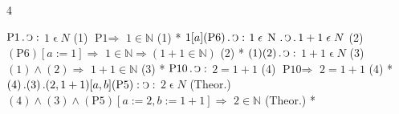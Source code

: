 \documentclass{book}
\newcommand{\s}{\switchcolumn} %
\newcommand{\C}{\mathop{\sbox0{$\displaystyle$$\reflectbox{C}$} %
\raisebox{-\height+\ht0-0.05cm}[\ht0][\dp0]{\scalebox{0.8}[0.8]{\copy0}}}\displaylimits} %
\newcommand{\p}{\mathop{\sbox0{$\displaystyle$$.$}
\raisebox{-\height+\ht0}[\ht0][\dp0]{\scalebox{1}[1]{\copy0}}}\displaylimits} %
\newcommand{\smallIn}{\ensuremath{\mathrel{\epsilon}}}
\newcommand{\N}{\mathop{\thinspace \text{N} \thinspace}}
\renewcommand{\rightarrow}{\Rightarrow}
\newenvironment{translateFourCol}[4]
               { %
                 \setcolumnwidth{#1\fill/1em, #2\fill/\columnsep, #3\fill/1em, #4\fill}
                 \begin{paracol}{4}
                 \newcommand{\LAT}{\switchcolumn[0]*}
                 \newcommand{\ENG}{\switchcolumn[2]}
               }
               { %
                 \let\ENG\undefined
                 \let\LAT\undefined
                 \end{paracol}
               }
\begin{document}
\begin{translateFourCol}{0.25}{0.25}{0.25}{0.25}
\raggedright
$\text{P1} \p \C :$ \s $1 \smallIn N$ \hfill (1)
\ENG
$\text{P1} \rightarrow$ \s $1 \in \mathbb{N}$ \hfill (1)
\LAT
$1 [a] (\text{P6}) \p \C :$ \s $1 \smallIn \N \p \C \p 1 + 1 \smallIn N$ \hfill (2)
\ENG
$(\text{P6})[a:=1] \rightarrow$ \s $1 \in \mathbb{N} \rightarrow (1 + 1 \in \mathbb{N})$ \hfill (2)
\LAT
$(1)(2) \p \C :$ \s $1 + 1 \smallIn N$ \hfill (3)
\ENG
$(1)\wedge(2) \rightarrow$ \s $1 + 1 \in \mathbb{N}$ \hfill (3)
\LAT
$\text{P10} \p \C :$ \s $2 = 1 + 1$ \hfill (4)
\ENG
$\text{P10} \rightarrow$ \s $2 = 1 + 1$ \hfill (4)
\LAT
$(4) \p (3) \p (2, 1+1) [a, b] (\text{P5}) : \C :$ \s $2 \smallIn N$ \hfill (Theor.)
\ENG
$(4) \wedge (3) \wedge (\text{P5})[a:=2,b:=1+1] \rightarrow$ \s $2 \in \mathbb{N}$ \hfill (Theor.)
\LAT
\end{translateFourCol}
\end{document}
